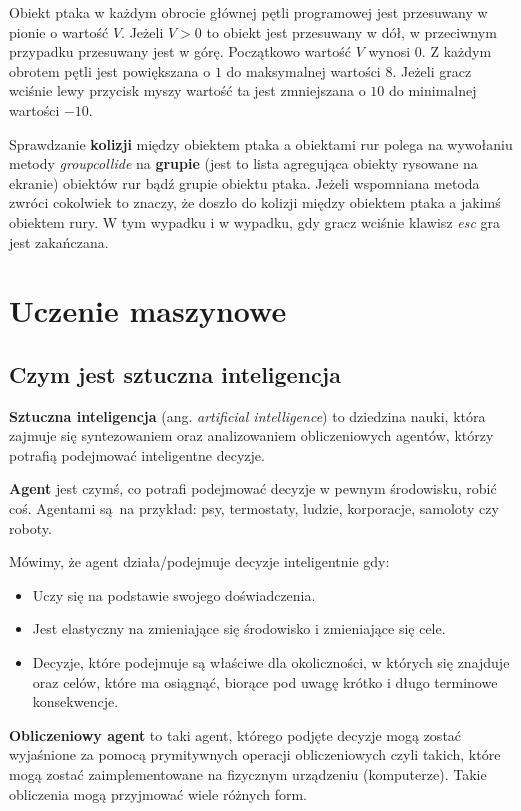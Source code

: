 \documentclass[a4paper, 12pt,twoside]{report}
\begin{document}
Obiekt ptaka w każdym obrocie głównej pętli programowej jest przesuwany
w pionie o wartość $V$. Jeżeli $V > 0$ to obiekt jest przesuwany w dół,
w przeciwnym przypadku przesuwany jest w górę. Początkowo wartość $V$ wynosi
$0$. Z każdym obrotem pętli jest powiększana o $1$ do maksymalnej wartości $8$.
Jeżeli gracz wciśnie lewy przycisk myszy wartość ta jest zmniejszana o $10$ do
minimalnej wartości $-10$.

Sprawdzanie \textbf{kolizji} między obiektem ptaka a obiektami rur polega na
wywołaniu metody \textit{groupcollide} na \textbf{grupie} (jest to lista
agregująca obiekty rysowane na ekranie) obiektów rur bądź grupie obiektu ptaka. 
Jeżeli wspomniana metoda zwróci cokolwiek to znaczy, że doszło do kolizji
między obiektem ptaka a jakimś obiektem rury. W tym wypadku i w wypadku, gdy
gracz wciśnie klawisz \textit{esc} gra jest zakańczana.

\chapter{Uczenie maszynowe}
\label{chapter:uczenie}
\section{Czym jest sztuczna inteligencja}
\textbf{Sztuczna inteligencja} (ang. \textit{artificial intelligence}) to
dziedzina nauki, która zajmuje się syntezowaniem oraz analizowaniem
obliczeniowych agentów, którzy potrafią podejmować inteligentne decyzje.

\textbf{Agent} jest czymś, co potrafi podejmować decyzje w pewnym środowisku,
robić coś. Agentami są na przykład: psy, termostaty, ludzie, korporacje,
samoloty czy roboty.

Mówimy, że agent działa/podejmuje decyzje inteligentnie gdy:
\begin{itemize}
	\setlength\itemsep{-0.4em}
	\item Uczy się na podstawie swojego doświadczenia.
	\item Jest elastyczny na zmieniające się środowisko i zmieniające się
		cele.
	\item Decyzje, które podejmuje są właściwe dla okoliczności, w których
		się znajduje oraz celów, które ma osiągnąć, biorące pod uwagę
		krótko i długo terminowe konsekwencje.
\end{itemize}

\textbf{Obliczeniowy agent} to taki agent, którego podjęte decyzje mogą
zostać wyjaśnione za pomocą prymitywnych operacji obliczeniowych
czyli takich, które mogą zostać zaimplementowane na fizycznym urządzeniu
(komputerze). Takie obliczenia mogą przyjmować wiele różnych form.
\end{document}
